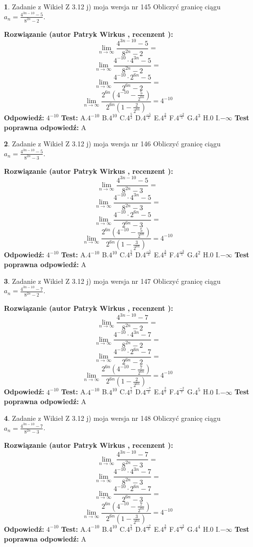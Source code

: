 \documentclass[12pt, a4paper]{article}
\theoremstyle{definition} %
\newtheorem{zad}{}
\newcommand{\zadStart}[1]{\begin{zad}#1\newline}
\newcommand{\zadStop}{\end{zad}}
\newcommand{\rozwStart}[2]{\noindent \textbf{Rozwiązanie (autor #1 , recenzent #2): }\newline}
\newcommand{\rozwStop}{\newline}
\newcommand{\odpStart}{\noindent \textbf{Odpowiedź:}\newline}
\newcommand{\odpStop}{\newline}
\newcommand{\testStart}{\noindent \textbf{Test:}\newline}
\newcommand{\testStop}{\newline}
\newcommand{\kluczStart}{\noindent \textbf{Test poprawna odpowiedź:}\newline}
\newcommand{\kluczStop}{\newline}
\begin{document}
\zadStart{Zadanie z Wikieł Z 3.12 j) moja wersja nr 145}
Obliczyć granicę ciągu $a_{n}=\frac{4^{3n-10}-5}{8^{2n}-2}$.
\zadStop
\rozwStart{Patryk Wirkus}{}
$$\lim\limits_{n\to\infty}\frac{4^{3n-10}-5}{8^{2n}-2}=$$
$$\lim\limits_{n\to\infty}\frac{4^{-10} \cdot 4^{3n}-5}{8^{2n}-2}=$$
$$\lim\limits_{n\to\infty}\frac{4^{-10} \cdot 2^{6n}-5}{2^{6n}-2}=$$
$$\lim\limits_{n\to\infty}\frac{2^{6n}(4^{-10} - \frac{5}{2^{6n}})}{2^{6n}(1-\frac{2}{2^{6n}})}= 4^{-10}$$
\rozwStop
\odpStart
$4^{-10}$
\odpStop
\testStart
A.$4^{-10}$
B.$4^{10}$
C.$4^{\frac{5}{2}}$
D.$4^{\frac{-5}{2}}$
E.$4^{\frac{2}{5}}$
F.$4^{\frac{-2}{5}}$
G.$4^{3}$
H.$0$
I.$-\infty$
\testStop
\kluczStart
A
\kluczStop



\zadStart{Zadanie z Wikieł Z 3.12 j) moja wersja nr 146}
Obliczyć granicę ciągu $a_{n}=\frac{4^{3n-10}-5}{8^{2n}-3}$.
\zadStop
\rozwStart{Patryk Wirkus}{}
$$\lim\limits_{n\to\infty}\frac{4^{3n-10}-5}{8^{2n}-3}=$$
$$\lim\limits_{n\to\infty}\frac{4^{-10} \cdot 4^{3n}-5}{8^{2n}-3}=$$
$$\lim\limits_{n\to\infty}\frac{4^{-10} \cdot 2^{6n}-5}{2^{6n}-3}=$$
$$\lim\limits_{n\to\infty}\frac{2^{6n}(4^{-10} - \frac{5}{2^{6n}})}{2^{6n}(1-\frac{3}{2^{6n}})}= 4^{-10}$$
\rozwStop
\odpStart
$4^{-10}$
\odpStop
\testStart
A.$4^{-10}$
B.$4^{10}$
C.$4^{\frac{5}{3}}$
D.$4^{\frac{-5}{3}}$
E.$4^{\frac{3}{5}}$
F.$4^{\frac{-3}{5}}$
G.$4^{2}$
H.$0$
I.$-\infty$
\testStop
\kluczStart
A
\kluczStop



\zadStart{Zadanie z Wikieł Z 3.12 j) moja wersja nr 147}
Obliczyć granicę ciągu $a_{n}=\frac{4^{3n-10}-7}{8^{2n}-2}$.
\zadStop
\rozwStart{Patryk Wirkus}{}
$$\lim\limits_{n\to\infty}\frac{4^{3n-10}-7}{8^{2n}-2}=$$
$$\lim\limits_{n\to\infty}\frac{4^{-10} \cdot 4^{3n}-7}{8^{2n}-2}=$$
$$\lim\limits_{n\to\infty}\frac{4^{-10} \cdot 2^{6n}-7}{2^{6n}-2}=$$
$$\lim\limits_{n\to\infty}\frac{2^{6n}(4^{-10} - \frac{7}{2^{6n}})}{2^{6n}(1-\frac{2}{2^{6n}})}= 4^{-10}$$
\rozwStop
\odpStart
$4^{-10}$
\odpStop
\testStart
A.$4^{-10}$
B.$4^{10}$
C.$4^{\frac{7}{2}}$
D.$4^{\frac{-7}{2}}$
E.$4^{\frac{2}{7}}$
F.$4^{\frac{-2}{7}}$
G.$4^{5}$
H.$0$
I.$-\infty$
\testStop
\kluczStart
A
\kluczStop



\zadStart{Zadanie z Wikieł Z 3.12 j) moja wersja nr 148}
Obliczyć granicę ciągu $a_{n}=\frac{4^{3n-10}-7}{8^{2n}-3}$.
\zadStop
\rozwStart{Patryk Wirkus}{}
$$\lim\limits_{n\to\infty}\frac{4^{3n-10}-7}{8^{2n}-3}=$$
$$\lim\limits_{n\to\infty}\frac{4^{-10} \cdot 4^{3n}-7}{8^{2n}-3}=$$
$$\lim\limits_{n\to\infty}\frac{4^{-10} \cdot 2^{6n}-7}{2^{6n}-3}=$$
$$\lim\limits_{n\to\infty}\frac{2^{6n}(4^{-10} - \frac{7}{2^{6n}})}{2^{6n}(1-\frac{3}{2^{6n}})}= 4^{-10}$$
\rozwStop
\odpStart
$4^{-10}$
\odpStop
\testStart
A.$4^{-10}$
B.$4^{10}$
C.$4^{\frac{7}{3}}$
D.$4^{\frac{-7}{3}}$
E.$4^{\frac{3}{7}}$
F.$4^{\frac{-3}{7}}$
G.$4^{4}$
H.$0$
I.$-\infty$
\testStop
\kluczStart
A
\kluczStop
\end{document}
